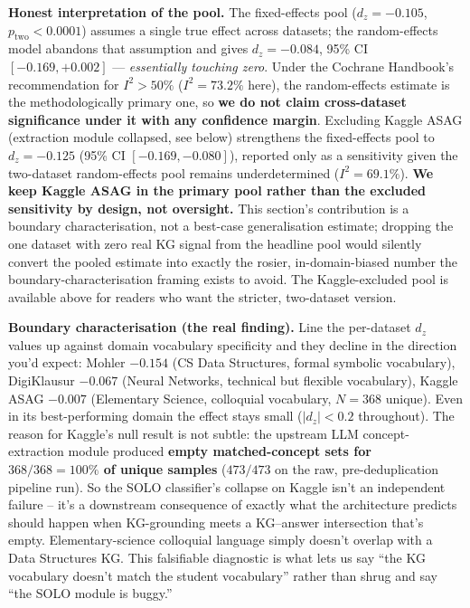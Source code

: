 \documentclass[conference]{IEEEtran}
\begin{document}
\textbf{Honest interpretation of the pool.} The fixed-effects pool
($d_z = -0.105$, $p_{\text{two}} < 0.0001$) assumes a single true
effect across datasets; the random-effects model abandons that
assumption and gives $d_z = -0.084$, 95\% CI $[-0.169, +0.002]$ ---
\emph{essentially touching zero}. Under the Cochrane Handbook's
recommendation for $I^2 > 50\%$ ($I^2=73.2\%$ here), the random-effects
estimate is the methodologically primary one, so \textbf{we do not
claim cross-dataset significance under it with any confidence
margin}. Excluding Kaggle ASAG (extraction module collapsed, see
below) strengthens the fixed-effects pool to $d_z=-0.125$ (95\% CI
$[-0.169,-0.080]$), reported only as a sensitivity given the
two-dataset random-effects pool remains underdetermined
($I^2=69.1\%$). \textbf{We keep Kaggle ASAG in the primary pool
rather than the excluded sensitivity by design, not oversight.}
This section's contribution is a boundary characterisation, not a
best-case generalisation estimate; dropping the one dataset with
zero real KG signal from the headline pool would silently convert
the pooled estimate into exactly the rosier, in-domain-biased number
the boundary-characterisation framing exists to avoid. The
Kaggle-excluded pool is available above for readers who want the
stricter, two-dataset version.

\textbf{Boundary characterisation (the real finding).} Line the
per-dataset $d_z$ values up against domain vocabulary specificity and
they decline in the direction you'd expect: Mohler $-0.154$ (CS Data
Structures, formal symbolic vocabulary), DigiKlausur $-0.067$ (Neural
Networks, technical but flexible vocabulary), Kaggle ASAG $-0.007$
(Elementary Science, colloquial vocabulary, $N=368$ unique). Even in
its best-performing domain the effect stays small ($|d_z|<0.2$
throughout). The reason for
Kaggle's null result is not subtle: the upstream LLM concept-extraction
module produced \textbf{empty matched-concept sets for $368/368 =
100\%$ of unique samples} ($473/473$ on the raw, pre-deduplication
pipeline run). So the SOLO classifier's collapse on Kaggle isn't an
independent failure -- it's a downstream consequence of exactly what
the architecture predicts should happen when KG-grounding meets a
KG--answer intersection that's empty. Elementary-science colloquial
language simply doesn't overlap with a Data Structures KG. This
falsifiable diagnostic is what lets us say ``the KG vocabulary doesn't
match the student vocabulary'' rather than shrug and say ``the SOLO
module is buggy.''
\end{document}
